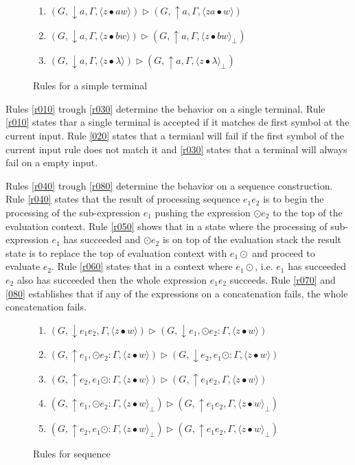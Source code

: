 \documentclass[manuscript, review, sigconf]{acmart}
\newcommand{\zpp}[2]{\langle #1\bullet #2 \rangle}
\newcommand{\zppf}[2]{\langle #1\bullet #2 \rangle_{\bot}}
\begin{document}
\begin{figure}[H]
\begin{enumerate}\addtocounter{enumi}{1}
  \item \label{r010} $(G, \downarrow a,\Gamma ,\zpp{z}{aw})       \rhd  (G, \uparrow a, \Gamma, \zpp{za}{w})$ 
  \item \label{r020} $(G, \downarrow a,\Gamma ,\zpp{z}{bw})       \rhd  (G, \uparrow a, \Gamma, \zppf{z}{bw})$ 
  \item \label{r030} $(G, \downarrow a,\Gamma ,\zpp{z}{\lambda})  \rhd  (G, \uparrow a, \Gamma, \zppf{z}{\lambda})$ 
\end{enumerate}
 \caption{Rules for a simple terminal}
 \label{fig:rule-simple}
\end{figure}

Rules \ref{r010} trough \ref{r030} determine the behavior on a single terminal. Rule \ref{r010} states thar a single terminal
is accepted if it matches de first symbol at the current input. Rule \ref{020} states that a termianl will fail if the first symbol of the current input rule
does not match it and \ref{r030} states that a terminal will always fail
on a empty input. 

Rules \ref{r040} trough \ref{r080} determine the behavior on a sequence construction. Rule \ref{r040} states that the result of processing sequence $e_1e_2$  is 
to begin the processing of the sub-expression $e_1$ pushing the expression $\odot e_2$ to the top of the evaluation context. Rule 
\ref{r050} shows that in a state where  the processing of sub-expression $e_1$ has succeeded and $\odot e_2$ is on top of the 
evaluation stack the result state is to replace the top of evaluation context with $e_1 \odot$ and proceed to evaluate $e_2$.
Rule \ref{r060} states that in a context where $e_1 \odot$, i.e. $e_1$ has succeeded $e_2$ also has succeeded then the whole expression $e_1e_2$ 
succeeds. Rule \ref{r070} and \ref{080} establishes that if any of the expressions on a concatenation fails, the whole concatenation fails. 

\begin{figure}[H]
\begin{enumerate}\addtocounter{enumi}{4}
  \item \label{r040} $(G, \downarrow e_1e_2,\Gamma ,\zpp{z}{w})    \rhd  (G, \downarrow e_1,  \odot e_2 : \Gamma, \zpp{z}{w})$ 
  \item \label{r050} $(G, \uparrow e_1 ,\odot e_2 : \Gamma ,\zpp{z}{w})   \rhd  (G, \downarrow e_2, e_1 \odot : \Gamma, \zpp{z}{w})$ 
  \item \label{r060} $(G, \uparrow e_2 ,e_1 \odot  : \Gamma ,\zpp{z}{w})   \rhd  (G, \uparrow e_1e_2, \Gamma, \zpp{z}{w})$
  \item \label{r070} $(G, \uparrow e_1 ,  \odot e_2 : \Gamma ,\zppf{z}{w})   \rhd  (G, \uparrow e_1 e_2, \Gamma, \zppf{z}{w})$ 
  \item \label{r080} $(G, \uparrow e_2 ,e_1 \odot  : \Gamma ,\zppf{z}{w})   \rhd  (G, \uparrow e_1e_2, \Gamma, \zppf{z}{w})$
\end{enumerate}
 \caption{Rules for sequence}
 \label{fig:rule-seq}
\end{figure}
\end{document}
